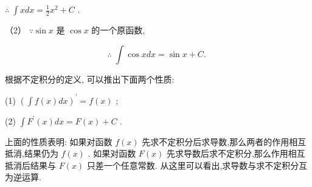 \documentclass[lang=cn,newtx,12pt,scheme=chinese]{elegantbook}
\begin{document}
\(\therefore \;\int {xdx} = \frac{1}{2}{x}^{2} + C\) .

（2） \(\because \sin x\) 是 \(\cos x\) 的一个原函数,

\[
\therefore \;\int \cos {xdx} = \sin x + C\text{. }
\]

\begin{proposition}[不定积分的性质]

根据不定积分的定义, 可以推出下面两个性质:

(1) \({\left( \int f\left( x\right) dx\right) }^{\prime } = f\left( x\right)\) ;

(2) \(\int {F}^{\prime }\left( x\right) {dx} = F\left( x\right) + C\) .

\end{proposition}

上面的性质表明: 如果对函数 \(f\left( x\right)\) 先求不定积分后求导数,那么两者的作用相互抵消,结果仍为 \(f\left( x\right)\) . 如果对函数 \(F\left( x\right)\) 先求导数后求不定积分,那么作用相互抵消后结果与 \(F\left( x\right)\) 只差一个任意常数. 从这里可以看出,求导数与求不定积分互为逆运算.
\end{document}
